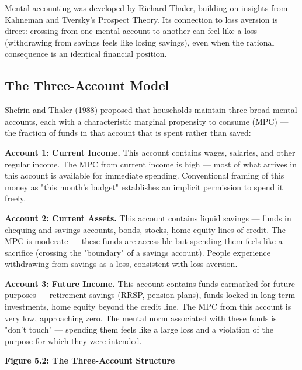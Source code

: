 \documentclass[12pt, letterpaper]{article}
\begin{document}
Mental accounting was developed by Richard Thaler, building on insights from Kahneman and Tversky's Prospect Theory. Its connection to loss aversion is direct: crossing from one mental account to another can feel like a loss (withdrawing from savings feels like losing savings), even when the rational consequence is an identical financial position.


\subsection{The Three-Account Model}


Shefrin and Thaler (1988) proposed that households maintain three broad mental accounts, each with a characteristic marginal propensity to consume (MPC) --- the fraction of funds in that account that is spent rather than saved:

\textbf{Account 1: Current Income.} This account contains wages, salaries, and other regular income. The MPC from current income is high --- most of what arrives in this account is available for immediate spending. Conventional framing of this money as "this month's budget" establishes an implicit permission to spend it freely.

\textbf{Account 2: Current Assets.} This account contains liquid savings --- funds in chequing and savings accounts, bonds, stocks, home equity lines of credit. The MPC is moderate --- these funds are accessible but spending them feels like a sacrifice (crossing the "boundary" of a savings account). People experience withdrawing from savings as a loss, consistent with loss aversion.

\textbf{Account 3: Future Income.} This account contains funds earmarked for future purposes --- retirement savings (RRSP, pension plans), funds locked in long-term investments, home equity beyond the credit line. The MPC from this account is very low, approaching zero. The mental norm associated with these funds is "don't touch" --- spending them feels like a large loss and a violation of the purpose for which they were intended.

\newpage
\textbf{Figure 5.2: The Three-Account Structure}
\end{document}

